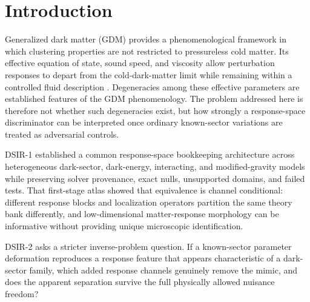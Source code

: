 \documentclass[11pt]{article}
\begin{document}
\begin{abstract}
The resulting hierarchy is methodological rather than diagnostic of new physics: response specificity depends on representation, resolvability, channel/operator, metric, and whether the physical comparison object is an oriented ray, a two-sided line, or a higher-dimensional nuisance subspace. Provider and finite-operator audits further show that theory-space response geometry does not guarantee observational admissibility. DSIR-2 therefore establishes a fail-closed ordering from representation to resolvability and nuisance geometry, while leaving covariance whitening and observational nuisance quotienting to downstream work.
\end{abstract}

\section{Introduction}
Generalized dark matter (GDM) provides a phenomenological framework in which clustering properties are not restricted to pressureless cold matter. Its effective equation of state, sound speed, and viscosity allow perturbation responses to depart from the cold-dark-matter limit while remaining within a controlled fluid description \citep{Hu1998GDM,KoppSkordisThomas2016GDM,ThomasKoppSkordis2016CMB,KunzNesserisSawicki2016LSS}. Degeneracies among these effective parameters are established features of the GDM phenomenology. The problem addressed here is therefore not whether such degeneracies exist, but how strongly a response-space discriminator can be interpreted once ordinary known-sector variations are treated as adversarial controls.

DSIR-1 established a common response-space bookkeeping architecture across heterogeneous dark-sector, dark-energy, interacting, and modified-gravity models while preserving solver provenance, exact nulls, unsupported domains, and failed tests. That first-stage atlas showed that equivalence is channel conditional: different response blocks and localization operators partition the same theory bank differently, and low-dimensional matter-response morphology can be informative without providing unique microscopic identification.

DSIR-2 asks a stricter inverse-problem question. If a known-sector parameter deformation reproduces a response feature that appears characteristic of a dark-sector family, which added response channels genuinely remove the mimic, and does the apparent separation survive the full physically allowed nuisance freedom?
\end{document}
